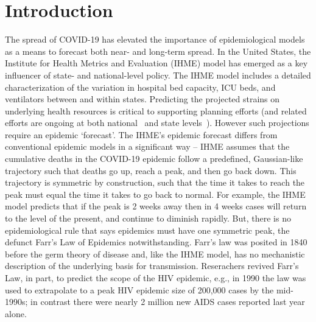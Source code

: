 \section{Introduction}
The spread of COVID-19 has elevated the importance of epidemiological
models as a means to forecast both near- and long-term spread. 
In the United States, the Institute for Health Metrics and Evaluation (IHME)
model has emerged as a key influencer of state- and national-level
policy.  The IHME model includes a detailed characterization
of the variation in
hospital bed capacity, ICU beds, and ventilators between and within
states. Predicting the projected strains on underlying
health resources
 is critical to supporting planning efforts (and related
efforts are ongoing at both national~\citep{meyers} and
state levels~\citep{upenn}).  However such projections require
an epidemic `forecast'.  The IHME's epidemic forecast
differs from conventional
epidemic models in a significant way -- IHME assumes
that the cumulative deaths in the COVID-19 epidemic
follow a predefined, Gaussian-like trajectory 
such that deaths go up, reach a peak,
and then go back down.  This trajectory is symmetric
by construction, such that the time it takes to reach the peak 
must equal the time it takes to go back to normal.  For example, the 
IHME model predicts that if the peak is 2 weeks away then in 4 weeks
cases will return to the level of the present, and continue
to diminish rapidly.  But, there is no epidemiological rule
that says epidemics must have one symmetric peak, 
the defunct Farr's Law of Epidemics notwithstanding. 
Farr's law was posited in 1840 before the
germ theory of disease and, like the IHME model, has 
no mechanistic description of the underlying basis for transmission. 
Reserachers revived Farr's Law, in part, to predict the scope of the HIV 
epidemic, e.g., in 1990
the law was used to extrapolate to a peak HIV epidemic size of 200,000 cases by the 
mid-1990s\citep{bregman_1990};
in contrast
there were nearly 2 million new AIDS cases reported last year alone.

